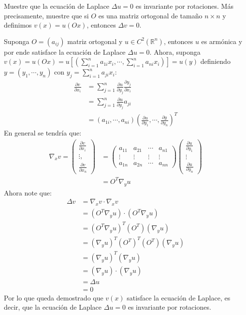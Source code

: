 \begin{homeworkProblem}
  Muestre que la ecuación de Laplace $\Delta u = 0$ es invariante por rotaciones. Más precisamente, muestre que si $O$ es una matriz ortogonal de tamaño $n\times n$ y definimos $v(x)=u(Ox)$, entonces $\Delta v = 0$. 
  \begin{solucion}
    Suponga $O=(a_{ij})$ matriz ortogonal y $u\in C^2(\mathbb{R}^{n})$, entonces $u$ es armónica y por ende satisface la ecuación de Laplace $\Delta u = 0$. Ahora, suponga $v(x)=u(Ox)=u[(\sum_{i=1}^n a_{1i}x_i,\cdots,\sum_{i=1}^n a_{ni}x_i)]=u(y)$ definiendo $y=(y_1,\cdots,y_n)$ con $y_j=\sum_{i=1}^{n}a_{ji}x_i$:
    \begin{align*}
      \frac{\partial v}{\partial x_i}&=\sum_{j=1}^n\frac{\partial u}{\partial y_j}\frac{\partial y_j}{\partial x_i}\\
      &=\sum_{j=1}^n\frac{\partial u}{\partial y_j}a_{ji}\\
      &=(a_{1i},\cdots,a_{ni})\left( \frac{\partial u}{\partial y_1}, \cdots, \frac{\partial y}{\partial y_n} \right)^T
    \end{align*}
    En general se tendría que:
    \begin{align*}
      \nabla_{x} v = \begin{pmatrix}
        \frac{\partial v}{\partial x_i}\\
        \vdots,\\
        \frac{\partial v}{\partial x_n}
      \end{pmatrix} &= \begin{pmatrix}
        a_{11} & a_{21} & \cdots & a_{n1}\\
        \vdots & \vdots & \vdots & \vdots\\
        a_{1n} & a_{2n} & \cdots & a_{nn}
      \end{pmatrix}
      \begin{pmatrix}
        \frac{\partial u}{\partial y_1}\\
        \vdots\\
        \frac{\partial u}{\partial y_n}
      \end{pmatrix}\\
      &=O^{T}\nabla_{y} u
    \end{align*}
    Ahora note que:
    \begin{align*}
      \Delta v &= \nabla_x v \cdot \nabla_x v\\
      &=(O^{T}\nabla_{y} u)\cdot (O^{T}\nabla_{y} u)\\
      &=(O^{T}\nabla_y u)^{T}(O^{T})(\nabla_{y} u)\\
      &=(\nabla_y u)^{T}(O^{T})^T(O^{T})(\nabla_{y} u)\\
      &=(\nabla_{y} u)^{T}(\nabla_{y} u)\\
      &=(\nabla_{y} u)\cdot(\nabla_{y} u)\\
      &=\Delta u\\
      &=0
    \end{align*}
    Por lo que queda demostrado que $v(x)$ satisface la ecuación de Laplace, es decir, que la ecuación de Laplace $\Delta u=0$ es invariante por rotaciones.
    \demostrado
  \end{solucion}
\end{homeworkProblem}
